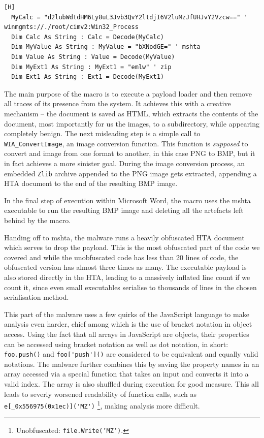 \begin{lstlisting}[language=VBScript, caption={Encoded Strings in the Macro}][H]
  MyCalc = "d2lubWdtdHM6Ly8uL3Jvb3QvY2ltdjI6V2luMzJfUHJvY2Vzcw==" ' winmgmts://./root/cimv2:Win32_Process
  Dim Calc As String : Calc = Decode(MyCalc)
  Dim MyValue As String : MyValue = "bXNodGE=" ' mshta
  Dim Value As String : Value = Decode(MyValue)
  Dim MyExt1 As String : MyExt1 = "emlw" ' zip
  Dim Ext1 As String : Ext1 = Decode(MyExt1)
\end{lstlisting}

The main purpose of the macro is to execute a payload loader and then remove all traces of its presence from the system.
It achieves this with a creative mechanism -- the document is saved as \acrshort{HTML}, which extracts the contents of the
document, most importantly for us the images, to a subdirectory, while appearing completely benign. The next misleading
step is a simple call to \verb+WIA_ConvertImage+, an image conversion function. This function is \emph{supposed} to
convert and image from one format to another, in this case \acrshort{PNG} to \acrshort{BMP}, but it in fact achieves a
more sinister goal. During the image conversion process, an embedded \verb+Zlib+ archive appended to the \acrshort{PNG}
image gets extracted, appending a \acrfull{HTA} document to the end of the resulting \acrshort{BMP} image.

In the final step of execution within Microsoft Word, the macro uses the \acrfull{mshta} executable to run the resulting
\acrshort{BMP} image and deleting all the artefacts left behind by the macro.

Handing off to \acrshort{mshta}, the malware runs a heavily obfuscated \acrshort{HTA} document which serves to drop the
payload. This is the most obfuscated part of the code we covered and while the unobfuscated code has less than 20 lines
of code, the obfuscated version has almost three times as many. The executable payload is also stored directly in the
\acrshort{HTA}, leading to a massively inflated line count if we count it, since even small executables serialise to
thousands of lines in the chosen serialisation method. 

This part of the malware uses a few quirks of the JavaScript language to make analysis even harder, chief among which is
the use of bracket notation in object access. Using the fact that all arrays in JavaScript are objects, their properties
can be accessed using bracket notation as well as dot notation, in short: \verb+foo.push()+ and \verb+foo['push']()+ are 
considered to be equivalent and equally valid notations. 
The malware further combines this by saving the property names in an array accessed via a special function that takes an 
input and converts it into a valid index. The array is also shuffled during execution for good measure. This all leads to 
severly worsened readability of function calls, such as \verb+e[_0x556975(0x1ec)]('MZ')+
\footnote{Unobfuscated: \texttt{file.Write('MZ')}.}, making analysis more difficult. %

